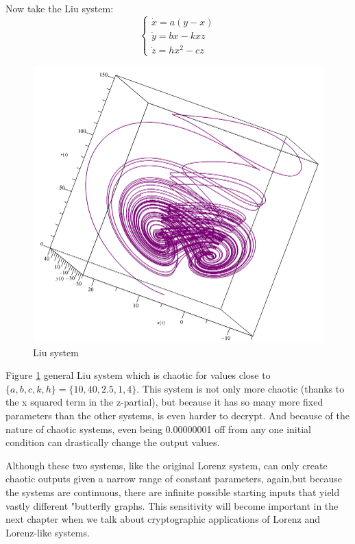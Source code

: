 \par Now take the Liu system:
%
\begin{equation}
\begin{cases} 
\dot{x} = a(y - x) \\ 
\dot{y} = bx - kxz \\
\dot{z} = hx^2 - cz
\end{cases}
\end{equation}
%
\begin{figure}[h!]
	\includegraphics[width=\linewidth]{liu2.PNG}
	\caption{Liu system}
	\label{fig:liu}
\end{figure}
Figure \ref{fig:liu} general Liu system
%
which is chaotic for values close to $\{a,b,c,k,h\} = \{10,40,2.5,1,4\}$.  This system is not only more chaotic (thanks to the x squared term in the z-partial), but because it has so many more fixed parameters than the other systems, is even harder to decrypt.  And because of the nature of chaotic systems, even being 0.00000001 off from any one initial condition can drastically change the output values.

Although these two systems, like the original Lorenz system, can only create chaotic outputs given a narrow range of constant parameters, again,but because the systems are continuous, there are infinite possible starting inputs that yield vastly different "butterfly graphs.  This sensitivity will become important in the next chapter when we talk about cryptographic applications of Lorenz and Lorenz-like systems.

\par 

%


